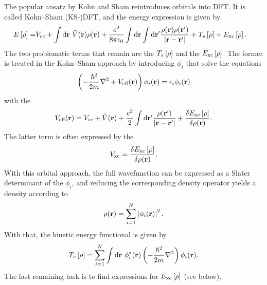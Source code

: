 The popular ansatz by Kohn and Sham reintroduces orbitals into
DFT.\cite{KohnSham1965} It is called Kohn--Sham (KS-)DFT, and the energy
expression is given by
\newcommand\er{\ed{\rho}}
\newcommand\exc{E_{\te{xc}}}
\begin{equation}
\begin{aligned}
 E\ed{\rho}=&\vcc+\indr\ \tilde V(\r) \rho(\r) + \frac
 {e^2}{8\pi\e_0}\indr\indr' \frac {\rho(\r)\rho(\r')}{\abs{\r-\r'}}
 +T_s 	\ed{\rho}+\exc\ed{\rho}.
\end{aligned}
\label{Theo:EnergyDensityFunctional}
\end{equation}
The two problematic terms that remain are the  $T_s\er$ and the
 $\exc\er$. The former is treated in the
Kohn--Sham approach by  introducing  $\phi_i$ that solve
the equations \newcommand\veff{V_{\te{eff}}}
\newcommand\hm{\frac{\hbar^2}{2m}}
\begin{equation}
\rb{-\frac{\hbar^2}{2m} \nabla^2 + \veff(\r)} \phi_i(\r) = \eps_i \phi_i(\r)
\label{Theo:SCFDFT}
\end{equation}
with the 
\begin{equation}
\veff(\r)=\vcc+ \tilde V(\r) + \frac {e^2}2 \indr'
\frac{\rho(\r')}{\abs{\r-\r'}}+\delti{\exc\er}{\rho(\r)}.
\label{Theo:Veff}
\end{equation}
The latter term is often expressed by the 
\newcommand\vxc{V_{\te{xc}}}
\begin{equation}
\vxc=\delti{\exc\er}{\rho(\r)}.
\label{Theo:Vxc}
\end{equation}
With this orbital approach, the full wavefunction can be expressed as a Slater determinant of 
the $\phi_i$, and reducing the corresponding density operator yields a density according to
\begin{equation}
\rho(\mathbf{r})=\sum_{i=1}^N \left|{\phi_i(\mathbf{r})}\right|^2.
\label{Theo:RhoByPhi}
\end{equation}
With that, the kinetic energy functional is given by
\begin{equation}
T_s\er=\sum_{i=1}^N \indr\ \phi_i^*(\r) \rb{-\hm \nabla^2} \phi_i(\r).
\end{equation}
The last remaining task is to find expressions for $\exc\er$ (see below).

